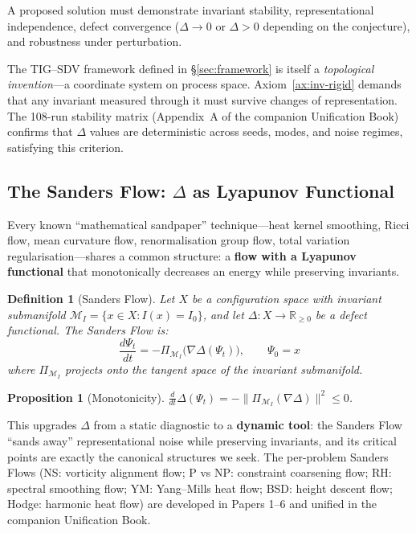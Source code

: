 \documentclass[11pt]{article}
\newtheorem{proposition}[theorem]{Proposition}
\newtheorem{definition}[theorem]{Definition}
\begin{document}
\begin{axiom}\label{ax:coherence-crit}
A proposed solution must demonstrate invariant stability, representational independence,
defect convergence ($\Delta \to 0$ or $\Delta > 0$ depending on the conjecture), and
robustness under perturbation.
\end{axiom}

\noindent
The TIG--SDV framework defined in \S\ref{sec:framework} is itself a \emph{topological
invention}---a coordinate system on process space. Axiom~\ref{ax:inv-rigid} demands
that any invariant measured through it must survive changes of representation. The
108-run stability matrix (Appendix~A of the companion Unification Book) confirms that
$\Delta$ values are deterministic across seeds, modes, and noise regimes, satisfying
this criterion.

\subsection{The Sanders Flow: $\Delta$ as Lyapunov Functional}
\label{sec:sanders-flow}

Every known ``mathematical sandpaper'' technique---heat kernel smoothing, Ricci flow,
mean curvature flow, renormalisation group flow, total variation regularisation---shares
a common structure: a \textbf{flow with a Lyapunov functional} that monotonically
decreases an energy while preserving invariants.

\begin{definition}[Sanders Flow]\label{def:sanders-flow}
Let $X$ be a configuration space with invariant submanifold
$\mathcal{M}_I = \{x \in X : I(x) = I_0\}$, and let $\Delta : X \to \mathbb{R}_{\geq 0}$
be a defect functional. The \emph{Sanders Flow} is:
\[
  \frac{d\Psi_t}{dt} = -\Pi_{\mathcal{M}_I}\!\bigl(\nabla \Delta(\Psi_t)\bigr),
  \qquad \Psi_0 = x
\]
where $\Pi_{\mathcal{M}_I}$ projects onto the tangent space of the invariant submanifold.
\end{definition}

\begin{proposition}[Monotonicity]
$\frac{d}{dt}\Delta(\Psi_t) = -\|\Pi_{\mathcal{M}_I}(\nabla\Delta)\|^2 \leq 0$.
\end{proposition}

\noindent
This upgrades $\Delta$ from a static diagnostic to a \textbf{dynamic tool}: the Sanders
Flow ``sands away'' representational noise while preserving invariants, and its critical
points are exactly the canonical structures we seek.  The per-problem Sanders Flows
(NS: vorticity alignment flow; P vs NP: constraint coarsening flow; RH: spectral
smoothing flow; YM: Yang--Mills heat flow; BSD: height descent flow; Hodge: harmonic
heat flow) are developed in Papers 1--6 and unified in the companion Unification Book.
\end{document}
